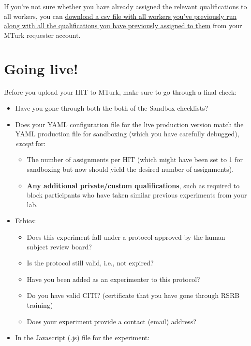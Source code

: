 \documentclass{article}
\begin{document}
If you're not sure whether you have already assigned the relevant qualifications to all workers, you can \href{https://requester.mturk.com/workers/download?utf8=\%E2\%9C\%93&check=true}{download a csv file with all workers you've previously run along with all the qualifications you have previously assigned to them} from your MTurk requester account.

\section{Going live!}

Before you upload your HIT to MTurk, make sure to go through a final check:

\begin{tcolorbox}[colback=gray!5,colframe=blue!40!black,title=Final checklist]
\begin{itemize}
    \item Have you gone through both the both of the Sandbox checklists?
    \item Does your YAML configuration file for the live production version match the YAML production file for sandboxing (which you have carefully debugged), {\em except} for:
    \begin{itemize}
      \item The number of assignments per HIT (which might have been set to 1 for sandboxing but now should yield the desired number of assignments).
      \item \textbf{Any additional private/custom qualifications}, such as required to block participants who have taken similar previous experiments from your lab.
    \end{itemize}
    \item Ethics:
    \begin{itemize}
        \item Does this experiment fall under a protocol approved by the human subject review board?
        \item Is the protocol still valid, i.e., not expired?
        \item Have you been added as an experimenter to this protocol?
        \item Do you have valid CITI? (certificate that you have gone through RSRB training)
        \item Does your experiment provide a contact (email) address?
    \end{itemize}
    \item In the Javascript (.js) file for the experiment:

\end{itemize}
\end{tcolorbox}
\end{document}
